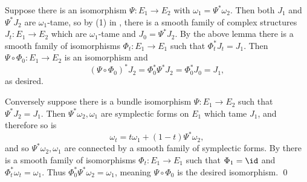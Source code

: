 \ethrm

\bproof

    Suppose there is an isomorphism $\Psi\colon E_1\to E_2$ with $\omega_1=\Psi^*\omega_2$.
    Then both $J_1$ and $\Psi^*J_2$ are $\omega_1$-tame, so by (1) in , there is a smooth family of complex structures $J_t\colon E_1\to E_2$ which are $\omega_1$-tame
    and $J_0=\Psi^*J_2$.
    By the above lemma there is a smooth family of isomorphisms $\Phi_t\colon E_1\to E_1$ such that $\Phi_t^*J_t=J_1$.
    Then $\Psi\circ\Phi_0\colon E_1\to E_2$ is an isomorphism and
    $$ (\Psi\circ\Phi_0)^*J_2 = \Phi_0^*\Psi^*J_2 = \Phi_0^*J_0 = J_1 , $$
    as desired.

    Conversely suppose there is a bundle isomorphism $\Psi\colon E_1\to E_2$ such that $\Psi^*J_2=J_1$.
    Then $\Psi^*\omega_2,\omega_1$ are symplectic forms on $E_1$ which tame $J_1$, and therefore so is
    $$ \omega_t = t\omega_1 + (1-t)\Psi^*\omega_2 , $$
    and so $\Psi^*\omega_2,\omega_1$ are connected by a smooth family of symplectic forms.
    By  there is a smooth family of isomorphisms $\Phi_t\colon E_1\to E_1$ such that $\Phi_1=\id$ and $\Phi_t^*\omega_t=\omega_1$.
    Thus $\Phi_0^*\Psi^*\omega_2=\omega_1$, meaning $\Psi\circ\Phi_0$ is the desired isomorphism.
    \qed

\eproof


